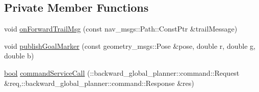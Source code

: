 \subsection*{Private Member Functions}
\begin{DoxyCompactItemize}
\item 
void \hyperlink{classcl__move__base__z_1_1backward__global__planner_1_1BackwardGlobalPlanner_a515bde5bfb3ae548f3e19209df1a48b0}{on\+Forward\+Trail\+Msg} (const nav\+\_\+msgs\+::\+Path\+::\+Const\+Ptr \&trail\+Message)
\item 
void \hyperlink{classcl__move__base__z_1_1backward__global__planner_1_1BackwardGlobalPlanner_a3c6784cad10fdadf28323380fe3d6d2b}{publish\+Goal\+Marker} (const geometry\+\_\+msgs\+::\+Pose \&pose, double r, double g, double b)
\item 
\hyperlink{classbool}{bool} \hyperlink{classcl__move__base__z_1_1backward__global__planner_1_1BackwardGlobalPlanner_a9884ef48689e81be9a4b6d784c62ac01}{command\+Service\+Call} (\+::backward\+\_\+global\+\_\+planner\+::command\+::\+Request \&req,\+::backward\+\_\+global\+\_\+planner\+::command\+::\+Response \&res)
\end{DoxyCompactItemize}
